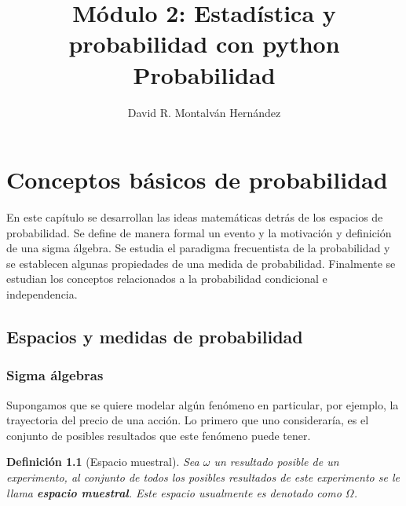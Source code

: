 \documentclass[11pt]{report}
\title{Módulo 2: Estadística y probabilidad con python \newline Probabilidad}
\author{David R. Montalván Hernández}
\date{}
\theoremstyle{break}
\newtheorem{definicion}{Definición}[chapter]
\theoremstyle{break}
\begin{document}
\sloppy %
\maketitle
\renewcommand{\contentsname}{Contenido}
\tableofcontents
\renewcommand{\listfigurename}{Lista de imágenes}
\listoffigures
\renewcommand{\listtablename}{Lista de tablas}
\renewcommand\tablename{Tabla}
\renewcommand{\bibname}{Referencias}
\renewcommand{\figurename}{Figura}
\renewcommand{\chaptername}{Capítulo}
\listoftables

\chapter{Conceptos básicos de probabilidad}
\label{capitulo:conceptos basicos}
En este capítulo se desarrollan las ideas matemáticas detrás de los espacios de probabilidad. Se define de manera formal un evento y la motivación y definición de una sigma álgebra. Se estudia el paradigma frecuentista de la probabilidad y se establecen algunas propiedades de una medida de probabilidad. Finalmente se estudian los conceptos relacionados a la probabilidad condicional e independencia.

\section{Espacios y medidas de probabilidad}
\label{seccion:espacios y medidas de probabilidad}

\subsection{Sigma álgebras}
\label{seccion:sigma algebras}

Supongamos que se quiere modelar algún fenómeno en particular, por ejemplo, la trayectoria del precio de una acción. Lo primero que uno consideraría, es el conjunto de posibles resultados que este fenómeno puede tener.

\begin{definicion}[Espacio muestral]
\label{definicion: espacio muestral}
Sea $\omega$ un resultado posible de un experimento, al conjunto de todos los posibles resultados de este experimento se le llama \textbf{espacio muestral}. Este espacio usualmente es denotado como $\Omega$.
\end{definicion}
\end{document}
